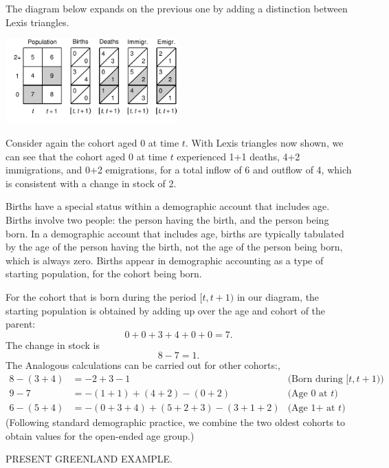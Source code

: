 \documentclass[USenglish]{article}
\begin{document}
The diagram below expands on the previous one by adding a distinction between Lexis triangles.
\begin{center}
\includegraphics[width=0.5\textwidth]{figures_accounts/fig_account_withage_lex.pdf}
\end{center}
Consider again the cohort aged 0 at time $t$. With Lexis triangles now shown, we can see that the cohort aged 0 at time $t$ experienced 1+1 deaths, 4+2 immigrations, and 0+2 emigrations, for a total inflow of 6 and outflow of 4, which is consistent with a change in stock of 2.

Births have a special status within a demographic account that includes age. Births involve two people: the person having the birth, and the person being born. In a demographic account that includes age, births are typically tabulated by the age of the person having the birth, not the age of the person being born, which is always zero. Births appear in demographic accounting as a type of starting population, for the cohort being born. 

For the cohort that is born during the period $[t,t+1)$ in our diagram, the starting population is obtained by adding up over the age and cohort of the parent:
\begin{equation*}
    0 + 0 + 3 + 4 + 0 + 0 = 7.
\end{equation*}
The change in stock is
\begin{equation*}
    8 - 7 = 1.
\end{equation*}
The 
Analogous calculations can be carried out for other cohorts:,
\begin{align}
    8 - (3 + 4) & = -2 + 3 - 1 & \text{(Born during $[t,t+1)$)} \\   
    9 - 7 & = -(1 + 1) + (4 + 2) - (0 + 2) & \text{(Age 0 at $t$)} \\
    6 - (5 + 4) & = -(0 + 3 + 4) + (5 + 2 + 3) - (3 + 1 + 2)  & \text{(Age 1+ at $t$)}
\end{align}
(Following standard demographic practice, we combine the two oldest cohorts to obtain values for the open-ended age group.)

PRESENT GREENLAND EXAMPLE.
\end{document}
